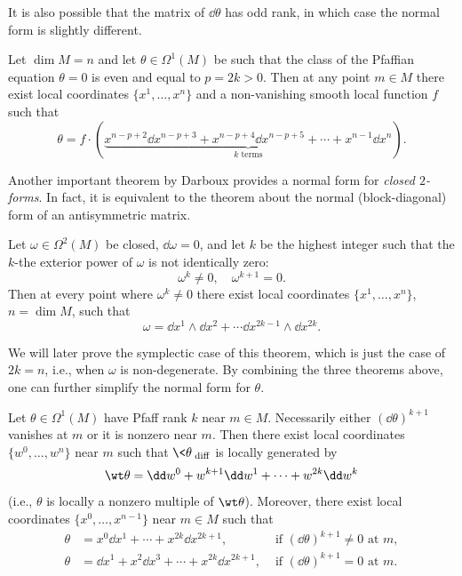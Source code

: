 It is also possible that the matrix of $\dd\theta$ has odd rank, in which case the normal form is slightly different.

\begin{thm}\label{thm pfaff normal form}
    Let $\dim M=n$ and let $\theta\in\Omega^1(M)$ be such that the class of the Pfaffian equation $\theta=0$ is even and equal to $p=2k>0$. Then at any point $m\in M$ there exist local coordinates $\{x^1,\ldots,x^n\}$ and a non-vanishing smooth local function $f$ such that 
    \[\theta=f\cdot (\underbrace{x^{n-p+2}\dd x^{n-p+3}+x^{n-p+4}\dd x^{n-p+5}+\cdots +x^{n-1}\dd x^n}_{k\text{ terms}}).\]
\end{thm}

Another important theorem by Darboux provides a normal form for \emph{closed $2$-forms}. In fact, it is equivalent to the theorem about the normal (block-diagonal) form of an antisymmetric matrix.

\begin{thm}[Darboux]
    Let $\omega\in\Omega^2(M)$ be closed, $\dd\omega=0$, and let $k$ be the highest integer such that the $k$-the exterior power of $\omega$ is not identically zero:
    \[\omega^k\neq 0,\quad \omega^{k+1}=0.\]
    Then at every point where $\omega^k\neq 0$ there exist local coordinates $\{x^1,\ldots,x^n\}$, $n=\dim M$, such that 
    \[\omega=\dd x^1\wedge \dd x^2+\cdots \dd x^{2k-1}\wedge\dd x^{2k}.\]
\end{thm}

We will later prove the symplectic case of this theorem, which is just the case of $2k=n$, i.e., when $\omega$ is non-degenerate. By combining the three theorems above, one can further simplify the normal form for $\theta$.

\begin{thm}[Darboux]
    Let $\theta\in\Omega^1(M)$ have Pfaff rank $k$ near $m\in M$. Necessarily either $(\dd\theta)^{k+1}$ vanishes at $m$ or it is nonzero near $m$. Then there exist local coordinates $\{w^0,\ldots,w^n\}$ near $m$ such that $\<\theta\>_{\mathrm{diff}}$ is locally generated by 
    \[\wt\theta=\dd w^0+w^{k+1}\dd w^1+\cdots +w^{2k}\dd w^k\]
    (i.e., $\theta$ is locally a nonzero multiple of $\wt\theta$). Moreover, there exist local coordinates $\{x^0,\ldots,x^{n-1}\}$ near $m\in M$ such that
    \begin{align}
        \theta&= x^0 \dd x^1+\cdots +x^{2k}\dd x^{2k+1}, &\text{ if }(\dd\theta)^{k+1}\neq 0\text{ at }m,\\
        \theta&= \dd x^1+ x^2\dd x^3+\cdots +x^{2k} \dd x^{2k+1}, &\text{ if }(\dd\theta)^{k+1}=0 \text{ at }m.
    \end{align}
\end{thm}


